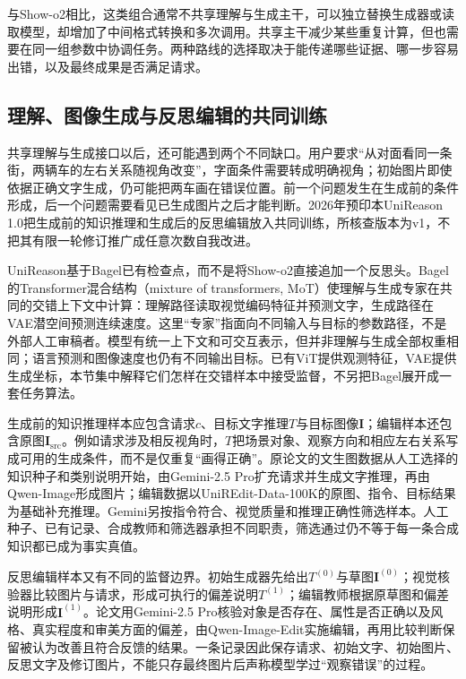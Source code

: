 与Show-o2相比，这类组合通常不共享理解与生成主干，可以独立替换生成器或读取模型，却增加了中间格式转换和多次调用。共享主干减少某些重复计算，但也需要在同一组参数中协调任务。两种路线的选择取决于能传递哪些证据、哪一步容易出错，以及最终成果是否满足请求。

\subsection{理解、图像生成与反思编辑的共同训练}
\label{sec:vision-models-unireason}

共享理解与生成接口以后，还可能遇到两个不同缺口。用户要求“从对面看同一条街，两辆车的左右关系随视角改变”，字面条件需要转成明确视角；初始图片即使依据正确文字生成，仍可能把两车画在错误位置。前一个问题发生在生成前的条件形成，后一个问题需要看见已生成图片之后才能判断。2026年预印本UniReason 1.0把生成前的知识推理和生成后的反思编辑放入共同训练，所核查版本为v1，不把其有限一轮修订推广成任意次数自我改进。

UniReason基于Bagel已有检查点，而不是将Show-o2直接追加一个反思头。Bagel的Transformer混合结构（mixture of transformers, MoT）使理解与生成专家在共同的交错上下文中计算：理解路径读取视觉编码特征并预测文字，生成路径在VAE潜空间预测连续速度。这里“专家”指面向不同输入与目标的参数路径，不是外部人工审稿者。模型有统一上下文和可交互表示，但并非理解与生成全部权重相同；语言预测和图像速度也仍有不同输出目标。已有ViT提供观测特征，VAE提供生成坐标，本节集中解释它们怎样在交错样本中接受监督，不另把Bagel展开成一套任务算法。

生成前的知识推理样本应包含请求$c$、目标文字推理$T$与目标图像$\bm I$；编辑样本还包含原图$\bm I_{\mathrm{src}}$。例如请求涉及相反视角时，$T$把场景对象、观察方向和相应左右关系写成可用的生成条件，而不是仅重复“画得正确”。原论文的文生图数据从人工选择的知识种子和类别说明开始，由Gemini-2.5 Pro扩充请求并生成文字推理，再由Qwen-Image形成图片；编辑数据以UniREdit-Data-100K的原图、指令、目标结果为基础补充推理。Gemini另按指令符合、视觉质量和推理正确性筛选样本。人工种子、已有记录、合成教师和筛选器承担不同职责，筛选通过仍不等于每一条合成知识都已成为事实真值。

反思编辑样本又有不同的监督边界。初始生成器先给出$T^{(0)}$与草图$\bm I^{(0)}$；视觉核验器比较图片与请求，形成可执行的偏差说明$T^{(1)}$；编辑教师根据原草图和偏差说明形成$\bm I^{(1)}$。论文用Gemini-2.5 Pro核验对象是否存在、属性是否正确以及风格、真实程度和审美方面的偏差，由Qwen-Image-Edit实施编辑，再用比较判断保留被认为改善且符合反馈的结果。一条记录因此保存请求、初始文字、初始图片、反思文字及修订图片，不能只存最终图片后声称模型学过“观察错误”的过程。

